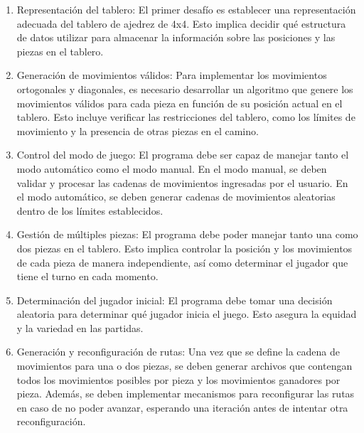 \begin{enumerate}
    \item Representación del tablero: El primer desafío es establecer una representación adecuada del tablero de ajedrez de 4x4. Esto implica decidir qué estructura de datos utilizar para almacenar la información sobre las posiciones y las piezas en el tablero.\newline

    \item Generación de movimientos válidos: Para implementar los movimientos ortogonales y diagonales, es necesario desarrollar un algoritmo que genere los movimientos válidos para cada pieza en función de su posición actual en el tablero. Esto incluye verificar las restricciones del tablero, como los límites de movimiento y la presencia de otras piezas en el camino.\newline
    
    \item Control del modo de juego: El programa debe ser capaz de manejar tanto el modo automático como el modo manual. En el modo manual, se deben validar y procesar las cadenas de movimientos ingresadas por el usuario. En el modo automático, se deben generar cadenas de movimientos aleatorias dentro de los límites establecidos.\newline
    
    \item Gestión de múltiples piezas: El programa debe poder manejar tanto una como dos piezas en el tablero. Esto implica controlar la posición y los movimientos de cada pieza de manera independiente, así como determinar el jugador que tiene el turno en cada momento.\newline
    
    \item Determinación del jugador inicial: El programa debe tomar una decisión aleatoria para determinar qué jugador inicia el juego. Esto asegura la equidad y la variedad en las partidas.\newline
    
    \item Generación y reconfiguración de rutas: Una vez que se define la cadena de movimientos para una o dos piezas, se deben generar archivos que contengan todos los movimientos posibles por pieza y los movimientos ganadores por pieza. Además, se deben implementar mecanismos para reconfigurar las rutas en caso de no poder avanzar, esperando una iteración antes de intentar otra reconfiguración.\newline
    

\end{enumerate}

